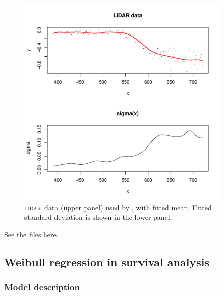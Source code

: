 \documentclass{admbmanual}
\newcommand{\citeasnoun}{\cite}
\newcommand{\scLIDAR}{\textsc{lidar}}
\begin{document}
\begin{figure}[h]
  \centering\hskip1pt
  \includegraphics[width=4in]{lidar_fig.pdf}
   \caption{\scLIDAR\ data (upper panel) used by \protect\citeasnoun{rupp:wand:carr:2003}, with fitted
    mean. Fitted standard deviation is shown in the lower panel.}
  \label{fig:lidar}
\end{figure}

See the files \href{http://otter-rsch.com/admbre/examples/lidar/lidar.html}{here}.


\subsection{Weibull regression in survival analysis}
\subsubsection{Model description}
\end{document}
